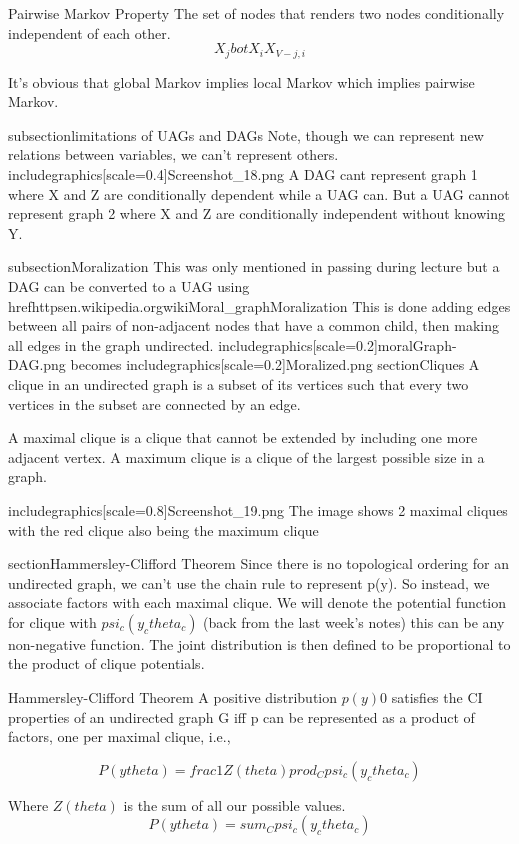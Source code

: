 Pairwise Markov Property The set of nodes that renders two nodes conditionally independent of each other.
$$X_j bot X_i X_{V - {j, i}}$$

It's obvious that global Markov implies local Markov which implies pairwise Markov.

subsection{limitations of UAGs and DAGs}
Note, though we can represent new relations between variables, we can't represent others.
includegraphics[scale=0.4]{Screenshot_18.png}
A DAG cant represent graph 1 where X and Z are conditionally dependent while a UAG can.
But a UAG cannot represent graph 2 where X and Z are conditionally independent without knowing Y.

subsection{Moralization}
This was only mentioned in passing during lecture but a DAG can be converted to a UAG using href{httpsen.wikipedia.orgwikiMoral_graph}{Moralization}
This is done adding edges between all pairs of non-adjacent nodes that have a common child, then making all edges in the graph undirected.
includegraphics[scale=0.2]{moralGraph-DAG.png} becomes
includegraphics[scale=0.2]{Moralized.png}
section{Cliques}
A clique in an undirected graph is a subset of its vertices such that every two vertices in the subset are connected by an edge.

A maximal clique is a clique that cannot be extended by including one more adjacent vertex.
A maximum clique is a clique of the largest possible size in a graph.

includegraphics[scale=0.8]{Screenshot_19.png}
The image shows 2 maximal cliques with the red clique also being the maximum clique

section{Hammersley-Clifford Theorem}
Since there is no topological ordering for an undirected graph, we can’t use the chain rule to represent p(y). So instead, we associate factors with each maximal clique.
We will denote the potential function for clique with $psi_c(y_ctheta_c)$ (back from the last week's notes) this can be any non-negative function.
The joint distribution is then defined to be proportional to the product of clique potentials.

Hammersley-Clifford Theorem A positive distribution $p(y)  0$ satisfies the CI properties of an undirected graph G iff p can be represented as a product of factors, one per maximal clique, i.e.,

$$P(ytheta) = frac{1}{Z(theta)} prod_C psi_c (y_ctheta_c)$$

Where $Z(theta)$ is the sum of all our possible values.
$$P(ytheta) = sum_C psi_c (y_ctheta_c)$$

